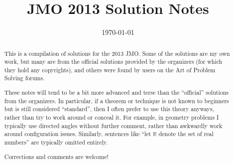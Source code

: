 \documentclass[11pt]{scrartcl}
\title{JMO 2013 Solution Notes}
\date{\today}
\begin{document}
\maketitle

\begin{abstract}
This is a compilation of solutions
for the 2013 JMO.
Some of the solutions are my own work,
but many are from the official solutions provided by the organizers
(for which they hold any copyrights),
and others were found by users on the Art of Problem Solving forums.

These notes will tend to be a bit more advanced and terse than the ``official''
solutions from the organizers.
In particular, if a theorem or technique is not known to beginners
but is still considered ``standard'', then I often prefer to
use this theory anyways, rather than try to work around or conceal it.
For example, in geometry problems I typically use directed angles
without further comment, rather than awkwardly work around configuration issues.
Similarly, sentences like ``let $\mathbb{R}$ denote the set of real numbers''
are typically omitted entirely.

Corrections and comments are welcome!
\end{abstract}

\tableofcontents
\newpage

\addtocounter{section}{-1}
\end{document}
